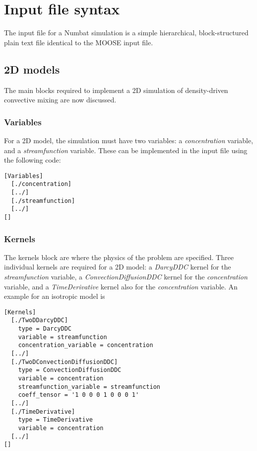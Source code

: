 \documentclass[11pt, a4paper]{csiroreport2012}
\begin{document}
\section{Input file syntax}

The input file for a Numbat simulation is a simple hierarchical, block-structured plain text file identical to the MOOSE input file. 

\subsection{2D models}

The main blocks required to implement a 2D simulation of density-driven convective mixing are now discussed.
\subsubsection*{Variables}

For a 2D model, the simulation must have two variables: a \emph{concentration} variable, and a \emph{streamfunction} variable. These can be implemented in the input file using the following code:

\begin{shaded}
\begin{verbatim}
[Variables]  
  [./concentration]  
  [../]  
  [./streamfunction]  
  [../]  
[]
\end{verbatim}
\end{shaded}

\subsubsection*{Kernels}

The kernels block are where the physics of the problem are specified. Three individual kernels are required for a 2D model: a \emph{DarcyDDC} kernel for the \emph{streamfunction} variable, a \emph{ConvectionDiffusionDDC} kernel for the \emph{concentration} variable, and a \emph{TimeDerivative} kernel also for the \emph{concentration} variable. An example for an isotropic model is

\begin{shaded}
\begin{verbatim}
[Kernels]
  [./TwoDDarcyDDC]
    type = DarcyDDC
    variable = streamfunction
    concentration_variable = concentration
  [../]
  [./TwoDConvectionDiffusionDDC]
    type = ConvectionDiffusionDDC
    variable = concentration
    streamfunction_variable = streamfunction
    coeff_tensor = '1 0 0 0 1 0 0 0 1'
  [../]
  [./TimeDerivative]
    type = TimeDerivative
    variable = concentration
  [../]
[]
\end{verbatim}
\end{shaded}
\end{document}
